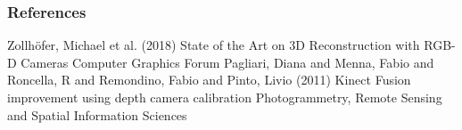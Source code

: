 \begin{frame}[allowframebreaks]
  \frametitle<presentation>{References}
  \begin{thebibliography}{1}
  \beamertemplatearticlebibitems
    Zollh{\"o}fer, Michael et al. (2018)
    \newblock State of the Art on 3D Reconstruction with RGB-D Cameras
    \newblock Computer Graphics Forum
    Pagliari, Diana and Menna, Fabio and Roncella, R and Remondino, Fabio and Pinto, Livio (2011)
    \newblock Kinect Fusion improvement using depth camera calibration
    \newblock Photogrammetry, Remote Sensing and Spatial Information Sciences
  \end{thebibliography}
\end{frame}
